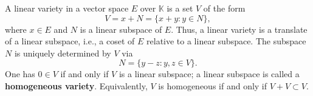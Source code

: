 A linear variety in a vector space $E$ over $\mathbb{K}$ is a set $V$ of the form
$$V = x + N = \{x + y : y \in N\},$$
where $x \in E$ and $N$ is a linear subspace of $E$. Thus, a linear variety is a translate of a linear subspace, i.e., a coset of $E$ relative to a linear subspace. The subspace $N$ is uniquely determined by $V$ via
$$N = \{y - z : y, z \in V\}.$$
One has $0 \in V$ if and only if $V$ is a linear subspace; a linear subspace is called a \textbf{homogeneous variety}. Equivalently, $V$ is homogeneous if and only if $V + V \subset V$.
